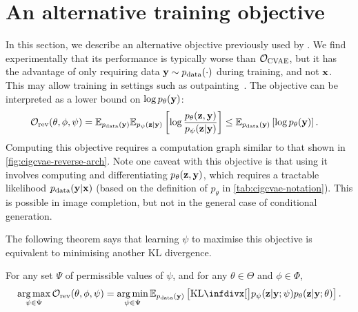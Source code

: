 \section{An alternative training objective}
\label{supp:cigcvae-ipa-r}
In this section, we describe an alternative objective previously used by
\citet{ma2018eddi}. We find experimentally that its performance is typically
worse than ${\mathcal{O}}_\text{CVAE}$, but it has the advantage of only
requiring data ${\mathbf{y}} \sim p_{\rm{data}} (\cdot)$ during training, and not ${\mathbf{x}}$.
This may allow training in settings such as
outpainting~\citep{sabini2018painting}. The objective can be interpreted as a
lower bound on $\log p_\theta({\mathbf{y}})$:
\begin{align} \label{eq:reverse-obj}
  \mathcal{O}_\text{rev}(\theta, \phi, \psi ) &= \mathbb{E}_{p_{\rm{data}} ({\mathbf{y}})}\mathbb{E}_{p_\psi({\mathbf{z}}|{\mathbf{y}})} \left[ \log\frac{p_\theta({\mathbf{z}},{\mathbf{y}})}{p_\psi({\mathbf{z}}|{\mathbf{y}})} \right] \leq \mathbb{E}_{p_{\rm{data}} ({\mathbf{y}})} \left[ \log p_\theta({\mathbf{y}}) \right].
\end{align}
Computing this objective requires a computation graph similar to that shown in
\cref{fig:cigcvae-reverse-arch}. Note one caveat with this objective is that using it
involves computing and differentiating $p_\theta({\mathbf{z}},{\mathbf{y}})$, which requires a
tractable likelihood $p_{\rm{data}} ({\mathbf{y}}|{\mathbf{x}})$ (based on the definition of
$p_\theta$ in \cref{tab:cigcvae-notation}). This is possible in image completion, but
not in the general case of conditional generation.

The following theorem says that learning $\psi $ to maximise this objective
is equivalent to minimising another KL divergence.
\begin{theorem} \label{theorem:reverse-kl} For any set $\Psi$ of
  permissible values of $\psi $, and for any $\theta\in\Theta$ and
  $\phi\in\Phi$,
  \begin{equation}
    \argmax_{\psi  \in \Psi} \mathcal{O}_\text{rev}(\theta, \phi, \psi ) = \argmin_{\psi  \in \Psi} \EX_{\pdata (\rvy)} \left[ \kl[\big] { p_\psi(\rvz|\rvy; \psi) }{ p_\theta(\rvz|\rvy; \theta) } \right].
  \end{equation}
\end{theorem}



